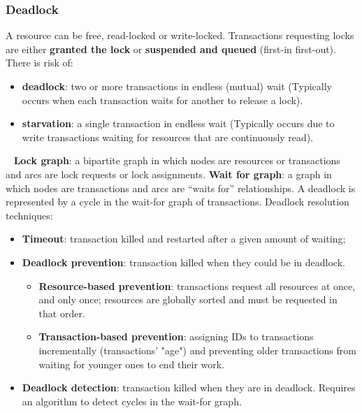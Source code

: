 \subsubsection{Deadlock}
A resource can be free, read-locked or write-locked.\newline
\newline
Transactions requesting locks are either \textbf{granted the lock} or
\textbf{suspended and queued} (first-in first-out). There is risk of:
\begin{itemize}
    \item \textbf{deadlock}: two or more transactions in endless (mutual) wait (Typically occurs when each transaction waits for
    another to release a lock).    
    \item \textbf{starvation}: a single transaction in endless wait (Typically occurs due to write transactions waiting for
    resources that are continuously read).
\end{itemize}
\ \newline
\textbf{Lock graph}:  a bipartite graph in which nodes are resources
or transactions and arcs are lock requests or lock
assignments.\newline
\newline
\textbf{Wait for graph}:  a graph in which nodes are transactions
and arcs are “waits for” relationships.\newline
A deadlock is represented by a cycle in the wait-for graph
of transactions.\newline
\newline
Deadlock resolution techniques:
\begin{itemize}
    \item \textbf{Timeout}: transaction killed and restarted after a given
    amount of waiting;
    \item \textbf{Deadlock prevention}: transaction killed when they could be in deadlock.
    \begin{itemize}
        \item \textbf{Resource-based prevention}: transactions request all resources at once, and only once; resources are globally sorted and must be requested in that order.
        \item \textbf{Transaction-based prevention}: assigning IDs to transactions incrementally (transactions' "age") and preventing older transactions from waiting for younger ones to end their work.
    \end{itemize}
    \item \textbf{Deadlock detection}: transaction killed when they are in deadlock. Requires an algorithm to detect cycles in the wait-for graph.
\end{itemize}
